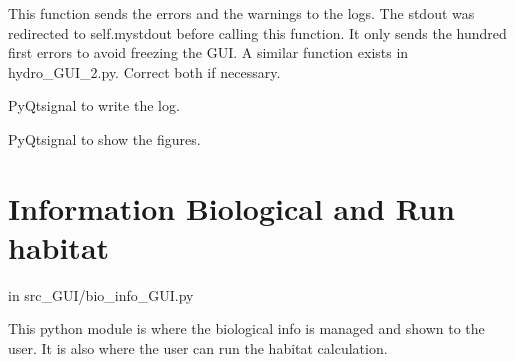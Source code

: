 \documentclass[letterpaper,10pt,english]{sphinxmanual}
\begin{document}
\begin{fulllineitems}

\begin{fulllineitems}
\label{\detokenize{index:src_GUI.estimhab_GUI.StatModUseful.send_err_log}}
This function sends the errors and the warnings to the logs.
The stdout was redirected to self.mystdout before calling this function. It only sends the hundred first errors
to avoid freezing the GUI. A similar function exists in hydro\_GUI\_2.py. Correct both if necessary.

\end{fulllineitems}


\begin{fulllineitems}
\label{\detokenize{index:src_GUI.estimhab_GUI.StatModUseful.send_log}}
PyQtsignal to write the log.

\end{fulllineitems}


\begin{fulllineitems}
\label{\detokenize{index:src_GUI.estimhab_GUI.StatModUseful.show_fig}}
PyQtsignal to show the figures.

\end{fulllineitems}


\end{fulllineitems}



\section{Information Biological and Run habitat}
\label{\detokenize{index:information-biological-and-run-habitat}}
in src\_GUI/bio\_info\_GUI.py

This python module is where the biological info is managed and shown to the user.
It is also where the user can run the habitat calculation.
\label{\detokenize{index:module-src_GUI.bio_info_GUI}}
\end{document}
